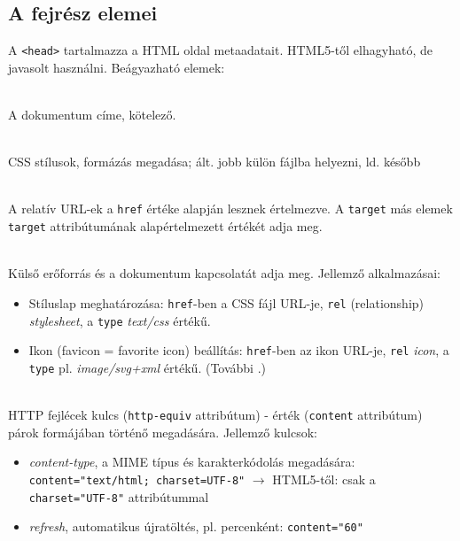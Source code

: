 \subsection{A fejrész elemei}

\begin{frame}
  A \texttt{<head>} tartalmazza a HTML oldal metaadatait. HTML5-től elhagyható, de javasolt használni. Beágyazható elemek:
  \begin{description}[m]
    \item[\texttt{<title>}] \hfill \\ A dokumentum címe, kötelező.
    \item[\texttt{<style>}] \hfill \\ CSS stílusok, formázás megadása; ált. jobb külön fájlba helyezni, ld. később 
    \item[\texttt{<base>}] \hfill \\ A relatív URL-ek a \texttt{href} értéke alapján lesznek értelmezve. A \texttt{target} más elemek \texttt{target} attribútumának alapértelmezett értékét adja meg.
  \end{description}
\end{frame}

\begin{frame}
  \begin{description}[m]
    \item[\texttt{<link>}] \hfill \\ Külső erőforrás és a dokumentum kapcsolatát adja meg. Jellemző alkalmazásai:
    \begin{itemize}
      \item Stíluslap meghatározása: \texttt{href}-ben a CSS fájl URL-je, \texttt{rel} (relationship) \emph{stylesheet}, a \texttt{type} \emph{text/css} értékű.
      \item Ikon (favicon = favorite icon) beállítás: \texttt{href}-ben az ikon URL-je, \texttt{rel} \emph{icon}, a \texttt{type} pl. \emph{image/svg+xml} értékű. (További .)
    \end{itemize}
    \item[\texttt{<meta>}] \hfill \\ HTTP fejlécek kulcs (\texttt{http-equiv} attribútum) - érték (\texttt{content} attribútum) párok formájában történő megadására. Jellemző kulcsok:
    \begin{itemize}
      \item \emph{content-type}, a MIME típus és karakterkódolás megadására: \texttt{content="text/html; charset=UTF-8"} $\to$ HTML5-től: csak a \texttt{charset="UTF-8"} attribútummal
      \item \emph{refresh}, automatikus újratöltés, pl. percenként: \texttt{content="60"}
    \end{itemize}
  \end{description}
\end{frame}

